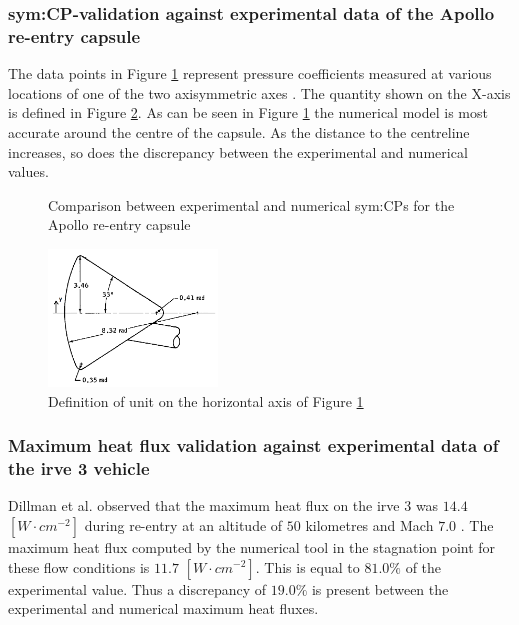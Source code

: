 \subsubsection{\gls{sym:CP}-validation against experimental data of the Apollo re-entry capsule}
\label{subsubsec:Apollo_validation}
The data points in Figure \ref{fig:Apollo_cp} represent pressure coefficients measured at various locations of one of the two axisymmetric axes \cite{Bertin1966}. The quantity shown on the X-axis is defined in Figure \ref{fig:Apollo_y}. As can be seen in Figure \ref{fig:Apollo_cp} the numerical model is most accurate around the centre of the capsule. As the distance to the centreline increases, so does the discrepancy between the experimental and numerical values.

\begin{figure}[ht]
	\centering
	\setlength{} 
	\setlength{}
	
	\caption{Comparison between experimental and numerical \glspl{sym:CP} for the Apollo re-entry capsule}
	\label{fig:Apollo_cp}
\end{figure}

\begin{figure}[ht]
	\centering
	\includegraphics[width=0.4\textwidth]{./Figure/Aerodynamics/Apollo_model}
	\caption[Definition of unit on the horizontal axis of Figure \ref{fig:Apollo_cp}]{Definition of unit on the horizontal axis of Figure \ref{fig:Apollo_cp} \cite{Bertin1966}}
	\label{fig:Apollo_y}
\end{figure}

\subsubsection{Maximum heat flux validation against experimental data of the \gls{irve} 3 vehicle}
\label{subsubsec:heatvalidation}
Dillman et al. observed that the maximum heat flux on the \acrfull{irve} 3 was $14.4$ $[W\cdot cm^{-2}]$ during re-entry at an altitude of $50$ kilometres and Mach $7.0$ \cite{Dillman2012}. The maximum heat flux computed by the numerical tool in the stagnation point for these flow conditions is $11.7$ $[W\cdot cm^{-2}]$. This is equal to $81.0\%$ of the experimental value. Thus a discrepancy of $19.0\%$ is present between the experimental and numerical maximum heat fluxes.


